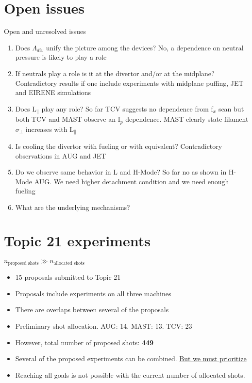 \documentclass[10pt, compress]{beamer}
\begin{document}
  \section{Open issues}
  \begin{frame}{Open and unresolved issues}
  \begin{enumerate}[<+(1) | invisible@-+>]
    \item Does $\Lambda_{div}$ unify the picture among the devices?
      \alert{No, a dependence on neutral pressure is likely to play a role}
    \item If neutrals play a role is it at the divertor and/or at the midplane?
      \alert{Contradictory results if one include experiments with
        midplane puffing, JET and EIRENE simulations}
    \item Does L$_\parallel$ play any role? \alert{So far TCV suggests no
      dependence from f$_x$ scan but both TCV and MAST observe an
      I$_p$ dependence. MAST clearly state filament $\sigma_{\perp}$
      increases with L$_{\parallel}$ }
    \item Is cooling the divertor with fueling or with equivalent? \alert{Contradictory observations in AUG and JET}
    \item Do we observe same behavior in L and H-Mode? \alert{So
      far no as shown in H-Mode AUG. We need higher detachment
      condition and we need enough fueling}
      \item What are the underlying mechanisms? 
    \end{enumerate}
  \end{frame}
  
\section{Topic 21 experiments }
\begin{frame}{$n_{\text{proposed shots}} \gg n_{\text{allocated shots}}$}
	\begin{itemize}
		\item 15 proposals submitted to Topic 21
		\item Proposals include experiments on all three machines 
		\item There are overlaps between several of the proposals 
		\item Preliminary shot allocation. AUG: 14. MAST: 13. TCV: 23
		\item However, total number of proposed shots:  \textbf{449}
		\item Several of the proposed experiments can be combined. \underline{But we must prioritize}
		\item Reaching all goals is not possible with the current number of allocated shots.
	\end{itemize}
\end{frame}
\end{document}
